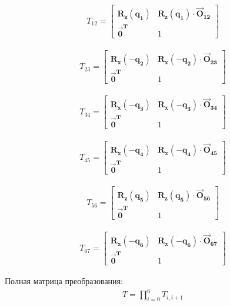 \begin{align*}
	T_{12} = \begin{bmatrix}
		\boldsymbol{R_{z}(q_{1})}		&		\boldsymbol{R_{z}(q_{1}) \cdot \vec{O}_{12}}\\
		\boldsymbol{\vec{0}^{T}}		&		1
	\end{bmatrix}
\end{align*}

\begin{align*}
	T_{23} = \begin{bmatrix}
		\boldsymbol{R_{x}(-q_{2})}		&		\boldsymbol{R_{x}(-q_{2}) \cdot \vec{O}_{23}}\\
		\boldsymbol{\vec{0}^{T}}		&		1
	\end{bmatrix}
\end{align*}

\begin{align*}
	T_{34} = \begin{bmatrix}
		\boldsymbol{R_{x}(-q_{3})}		&		\boldsymbol{R_{x}(-q_{3}) \cdot \vec{O}_{34}}\\
		\boldsymbol{\vec{0}^{T}}		&		1
	\end{bmatrix}
\end{align*}

\begin{align*}
	T_{45} = \begin{bmatrix}
		\boldsymbol{R_{x}(-q_{4})}		&		\boldsymbol{R_{x}(-q_{4}) \cdot \vec{O}_{45}}\\
		\boldsymbol{\vec{0}^{T}}		&		1
	\end{bmatrix}
\end{align*}

\begin{align*}
	T_{56} = \begin{bmatrix}
		\boldsymbol{R_{z}(q_{5})}		&		\boldsymbol{R_{z}(q_{5}) \cdot \vec{O}_{56}}\\
		\boldsymbol{\vec{0}^{T}}		&		1
	\end{bmatrix}
\end{align*}

\begin{align*}
	T_{67} = \begin{bmatrix}
		\boldsymbol{R_{x}(-q_{6})}		&		\boldsymbol{R_{x}(-q_{6}) \cdot \vec{O}_{67}}\\
		\boldsymbol{\vec{0}^{T}}		&		1
	\end{bmatrix}
\end{align*}

Полная матрица преобразования:
\begin{align*}
	T = \prod_{i=0}^{6}T_{i,i+1}
\end{align*}




